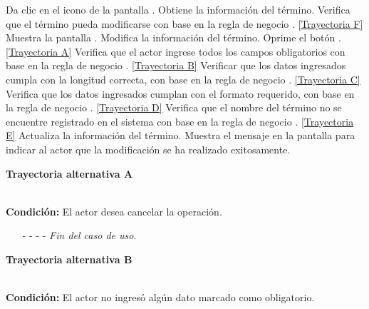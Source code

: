 	\begin{UCtrayectoria}
		\UCpaso[\UCactor] Da clic en el icono \editar de la pantalla .
		\UCpaso[\UCsist] Obtiene la información del término.
		\UCpaso[\UCsist] Verifica que el término pueda modificarse con base en la regla de negocio . \hyperlink{CU6-2:TAF}{[Trayectoria F]}
		\UCpaso[\UCsist] Muestra la pantalla .
		\UCpaso[\UCactor] Modifica la información del término. \label{CU6.2-P5}
		\UCpaso[\UCactor] Oprime el botón . \hyperlink{CU6-2:TAB}{[Trayectoria A]}
		\UCpaso[\UCsist] Verifica que el actor ingrese todos los campos obligatorios con base en la regla de negocio . \hyperlink{CU6-2:TAB}{[Trayectoria B]}
		\UCpaso[\UCsist] Verificar que los datos ingresados cumpla con la longitud correcta, con base en la regla de negocio . \hyperlink{CU6-2:TAC}{[Trayectoria C]}
		\UCpaso[\UCsist] Verifica que los datos ingresados cumplan con el formato requerido, con base en la regla de negocio . \hyperlink{CU6-2:TAD}{[Trayectoria D]}
		\UCpaso[\UCsist] Verifica que el nombre del término no se encuentre registrado en el sistema con base en la regla de negocio . \hyperlink{CU6-2:TAE}{[Trayectoria E]}
		\UCpaso[\UCsist] Actualiza la información del término.
		\UCpaso[\UCsist] Muestra el mensaje  en la pantalla  para indicar al actor que la modificación se ha realizado exitosamente.
	\end{UCtrayectoria}		
	\hypertarget{CU6-2:TAA}{\textbf{Trayectoria alternativa A}}\\
	\noindent \textbf{Condición:} El actor desea cancelar la operación.
	\begin{enumerate}
		\UCpaso[\UCactor] Solicita cancelar la operación oprimiendo el botón  de la pantalla 
		\UCpaso[\UCsist] Muestra la pantalla .
		\item[- -] - - {\em {Fin del caso de uso}}.%
	\end{enumerate}
	\hypertarget{CU6-2:TAB}{\textbf{Trayectoria alternativa B}}\\
	\noindent \textbf{Condición:} El actor no ingresó algún dato marcado como obligatorio.
